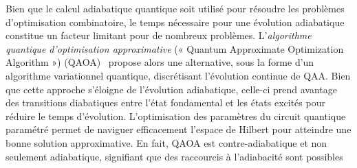 Bien que le calcul adiabatique quantique soit utilisé pour résoudre les problèmes d'optimisation combinatoire, le temps nécessaire pour une évolution adiabatique constitue un facteur limitant pour de nombreux problèmes. L'\textit{algorithme quantique d'optimisation approximative} (« Quantum Approximate Optimization Algorithm ») (QAOA)~\cite{farhiQuantumApproximateOptimization2014} propose alors une alternative, sous la forme d'un algorithme variationnel quantique, discrétisant l'évolution continue de QAA. Bien que cette approche s'éloigne de l'évolution adiabatique, celle-ci prend avantage des transitions diabatiques entre l'état fondamental et les états excités pour réduire le temps d'évolution. L'optimisation des paramètres du circuit quantique paramétré permet de naviguer efficacement l'espace de Hilbert pour atteindre une bonne solution approximative. En fait, QAOA est contre-adiabatique et non seulement adiabatique, signifiant que des raccourcis à l'adiabacité sont possibles~\cite{wurtzCounterdiabaticityQuantumApproximate2022}

